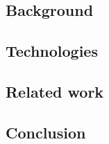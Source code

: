 \subsection{Background}
\subsection{Technologies}
\subsection{Related work}
\subsection{Conclusion}
